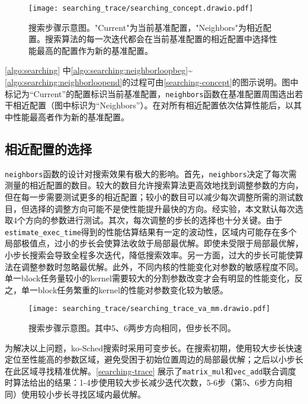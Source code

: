 \begin{figure}[htbp]
    \centering
    \texttt{[image: searching\_trace/searching\_concept.drawio.pdf]}
    \caption{搜索步骤示意图。"Current"为当前基准配置，"Neighbors"为相近配置。搜索算法的每一次迭代都会在当前基准配置的相近配置中选择性能最高的配置作为新的基准配置。}
    \label{searching-concept}
\end{figure}

\autoref{algo:searching} 中\autoref{algo:searching:neighborloopbeg}\textasciitilde\autoref{algo:searching:neighborloopend}的过程可由\autoref{searching-concept}的图示说明。图中标记为“Current”的配置标识当前基准配置，\texttt{neighbors}函数在基准配置周围选出若干相近配置（图中标识为“Neighbors”）。在对所有相近配置依次估算性能后，以其中性能最高者作为新的基准配置。

\subsection{相近配置的选择}

\texttt{neighbors}函数的设计对搜索效果有极大的影响。首先，\texttt{neighbors}决定了每次需测量的相近配置的数目。较大的数目允许搜索算法更高效地找到调整参数的方向，但在每一步需要测试更多的相近配置；较小的数目可以减少每次调整所需的测试数目，但选择的调整方向可能不是使性能提升最快的方向。经实验，本文默认每次选取4个方向的参数进行测试。其次，每次调整的步长的选择也十分关键。由于\texttt{estimate\_exec\_time}得到的性能估算结果有一定的波动性，区域内可能存在多个局部极值点，过小的步长会使算法收敛于局部最优解。即使未受限于局部最优解，小步长搜索会导致全程多次迭代，降低搜索效率。另一方面，过大的步长可能使算法在调整参数时忽略最优解。此外，不同内核的性能变化对参数的敏感程度不同。单一block任务量较小的kernel需要较大的分割参数改变才会有明显的性能变化，反之，单一block任务繁重的kernel的性能对参数变化较为敏感。

\begin{figure}[htbp]
    \centering
    \texttt{[image: searching\_trace/searching\_trace\_va\_mm.drawio.pdf]}
    \caption{搜索步骤示意图。其中5、6两步方向相同，但步长不同。}
    \label{searching-trace}
\end{figure}

为解决以上问题，ko-Sched搜索时采用可变步长。在搜索初期，使用较大步长快速定位至性能高的参数区域，避免受困于初始位置周边的局部最优解；之后以小步长在此区域寻找精准优解。\autoref{searching-trace} 展示了\texttt{matrix\_mul}和\texttt{vec\_add}联合调度时算法给出的结果：1-4步使用较大步长减少迭代次数，5-6步（第5、6步方向相同）使用较小步长寻找区域内最优解。

